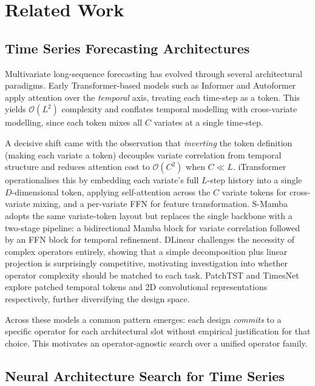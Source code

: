 \section{Related Work}
\label{sec:background}

\subsection{Time Series Forecasting Architectures}

Multivariate long-sequence forecasting has evolved through several architectural paradigms.
Early Transformer-based models such as Informer \cite{zhou2021informer} and Autoformer \cite{wu2021autoformer} apply attention over the \emph{temporal} axis, treating each time-step as a token.
This yields $\mathcal{O}(L^2)$ complexity and conflates temporal modelling with cross-variate modelling, since each token mixes all $C$ variates at a single time-step.

A decisive shift came with the observation that \emph{inverting} the token definition (making each variate a token) decouples variate correlation from temporal structure and reduces attention cost to $\mathcal{O}(C^2)$ when $C \ll L$.
iTransformer \cite{liu2024itransformer} operationalises this by embedding each variate's full $L$-step history into a single $D$-dimensional token, applying self-attention across the $C$ variate tokens for cross-variate mixing, and a per-variate FFN for feature transformation.
S-Mamba \cite{wang2024smamba} adopts the same variate-token layout but replaces the single backbone with a two-stage pipeline: a bidirectional Mamba block for variate correlation followed by an FFN block for temporal refinement.
DLinear \cite{zeng2023dlinear} challenges the necessity of complex operators entirely, showing that a simple decomposition plus linear projection is surprisingly competitive, motivating investigation into whether operator complexity should be matched to each task.
PatchTST \cite{nie2023patchtst} and TimesNet \cite{wu2023timesnet} explore patched temporal tokens and 2D convolutional representations respectively, further diversifying the design space.

Across these models a common pattern emerges: each design \emph{commits} to a specific operator for each architectural slot without empirical justification for that choice.
This motivates an operator-agnostic search over a unified operator family.

\subsection{Neural Architecture Search for Time Series}


